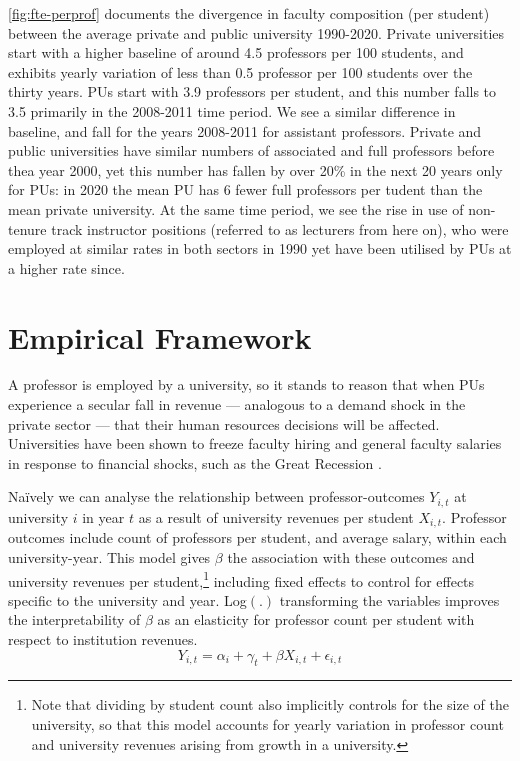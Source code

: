 \documentclass[notitlepage,12pt]{article}
\begin{document}
\autoref{fig:fte-perprof} documents the divergence in faculty composition (per student) between the average private and public university 1990-2020.
Private universities start with  a higher baseline of around 4.5 professors per 100 students, and exhibits yearly variation of less than 0.5 professor per 100 students over the thirty years.
PUs start with 3.9 professors per student, and this number falls to 3.5 primarily in the 2008-2011 time period.
We see a similar difference in baseline, and fall for the years 2008-2011 for assistant professors.
Private and public universities have similar numbers of associated and full professors before thea year 2000, yet this number has fallen by over 20\% in the next 20 years only for PUs: in 2020 the mean PU has 6 fewer full professors per tudent than the mean private university.
At the same time period, we see the rise in use of non-tenure track instructor positions (referred to as lecturers from here on), who were employed at similar rates in both sectors in 1990 yet have been utilised by PUs at a higher rate since.


\section{Empirical Framework}
\label{sec:empirics}

A professor is employed by a university, so it stands to reason that when PUs experience a secular fall in revenue --- analogous to a demand shock in the private sector --- that their human resources decisions will be affected.
Universities have been shown to freeze faculty hiring and general faculty salaries in response to financial shocks, such as the Great Recession \citep{turner2014impact}.

Na\"ively we can analyse the relationship between professor-outcomes $Y_{i,t}$ at university $i$ in year $t$ as a result of university revenues per student $X_{i,t}$.
Professor outcomes include count of professors per student, and average salary, within each university-year.
This model gives $\beta$ the association with these outcomes and university revenues per student,\footnote{
    Note that dividing by student count also implicitly controls for the size of the university, so that this model accounts for yearly variation in professor count and university revenues arising from growth in a university.
}
including fixed effects to control for effects specific to the university and year.
Log$(.)$ transforming the variables improves the interpretability of $\beta$ as an elasticity for professor count per student with respect to institution revenues.
\begin{equation}
    \label{eqn:naivereg}
    Y_{i,t} = \alpha_i + \gamma_t + \beta X_{i,t} + \epsilon_{i,t}
\end{equation}
\end{document}

